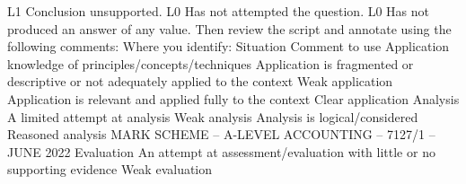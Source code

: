 \documentclass{article}
\begin{document}
 \newline
L1 \newline
Conclusion unsupported. \newline
 \newline
L0 \newline
Has not attempted the question. \newline
 \newline
L0 \newline
Has not produced an answer of any value. \newline
 \newline
 \newline
Then review the script and annotate using the following comments:  \newline
 \newline
Where you identify: \newline
Situation \newline
Comment to use \newline
Application \newline
knowledge of \newline
principles/concepts/techniques \newline
Application is fragmented or \newline
descriptive or not adequately \newline
applied to the context \newline
Weak application \newline
Application is relevant and \newline
applied fully to the context \newline
Clear application \newline
Analysis  \newline
A limited attempt at analysis \newline
Weak analysis \newline
Analysis is logical/considered \newline
Reasoned analysis \newline
MARK SCHEME – A-LEVEL ACCOUNTING – 7127/1 – JUNE 2022  \newline
Evaluation \newline
An attempt at \newline
assessment/evaluation with \newline
little or no supporting \newline
evidence \newline
Weak evaluation \newline
\end{document}
